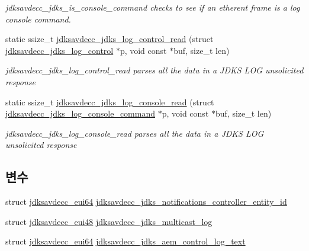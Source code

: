 \begin{DoxyCompactItemize}
\begin{DoxyCompactList}\small\item\em jdksavdecc\+\_\+jdks\+\_\+is\+\_\+console\+\_\+command checks to see if an etherent frame is a log console command. \end{DoxyCompactList}\item 
static ssize\+\_\+t \hyperlink{group__jdks__log_ga564507c73741faa269e846895bae6e16}{jdksavdecc\+\_\+jdks\+\_\+log\+\_\+control\+\_\+read} (struct \hyperlink{structjdksavdecc__jdks__log__control}{jdksavdecc\+\_\+jdks\+\_\+log\+\_\+control} $\ast$p, void const $\ast$buf, size\+\_\+t len)
\begin{DoxyCompactList}\small\item\em jdksavdecc\+\_\+jdks\+\_\+log\+\_\+control\+\_\+read parses all the data in a J\+D\+KS L\+OG unsolicited response \end{DoxyCompactList}\item 
static ssize\+\_\+t \hyperlink{group__jdks__log_gae585c2248e5de55f0cc52a0241a8cd21}{jdksavdecc\+\_\+jdks\+\_\+log\+\_\+console\+\_\+read} (struct \hyperlink{structjdksavdecc__jdks__log__console__command}{jdksavdecc\+\_\+jdks\+\_\+log\+\_\+console\+\_\+command} $\ast$p, void const $\ast$buf, size\+\_\+t len)
\begin{DoxyCompactList}\small\item\em jdksavdecc\+\_\+jdks\+\_\+log\+\_\+console\+\_\+read parses all the data in a J\+D\+KS L\+OG unsolicited response \end{DoxyCompactList}\end{DoxyCompactItemize}
\subsection*{변수}
\begin{DoxyCompactItemize}
\item 
struct \hyperlink{structjdksavdecc__eui64}{jdksavdecc\+\_\+eui64} \hyperlink{group__jdks__log_gaa8a55f45c47024872aea1d756c51cd7d}{jdksavdecc\+\_\+jdks\+\_\+notifications\+\_\+controller\+\_\+entity\+\_\+id}
\item 
struct \hyperlink{structjdksavdecc__eui48}{jdksavdecc\+\_\+eui48} \hyperlink{group__jdks__log_gae6aee409d176c6cbbc79c18ec2bed520}{jdksavdecc\+\_\+jdks\+\_\+multicast\+\_\+log}
\item 
struct \hyperlink{structjdksavdecc__eui64}{jdksavdecc\+\_\+eui64} \hyperlink{group__jdks__log_ga492c3be3079a48fdf9366bdc514c0333}{jdksavdecc\+\_\+jdks\+\_\+aem\+\_\+control\+\_\+log\+\_\+text}
\end{DoxyCompactItemize}


